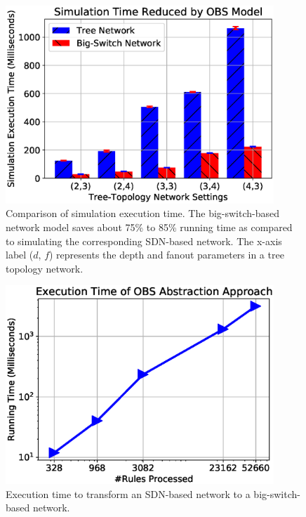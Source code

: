 \begin{figure}[ht]
\centering
\includegraphics[width=0.9\textwidth]{OneBigSwitch/figures/comp_sim_time.eps}
\caption[Comparison of Simulation Execution Time]{Comparison of simulation execution time.
        The big-switch-based network model saves about 75\% to 85\% running time
        as compared to simulating the corresponding SDN-based network.
        The x-axis label ($d$, $f$) represents the depth and fanout parameters in a tree topology network.}
\label{OBS:Fig:CompareSimulationTime}
\end{figure}

\begin{figure}[ht]
\centering
\includegraphics[width=0.9\textwidth]{OneBigSwitch/figures/bs_overhead.eps}
\caption[Execution Time of One-Big-Switch Abstraction]{Execution time to transform an SDN-based network to a big-switch-based network.}
\label{OBS:Fig:BSOverhead}
\end{figure}

